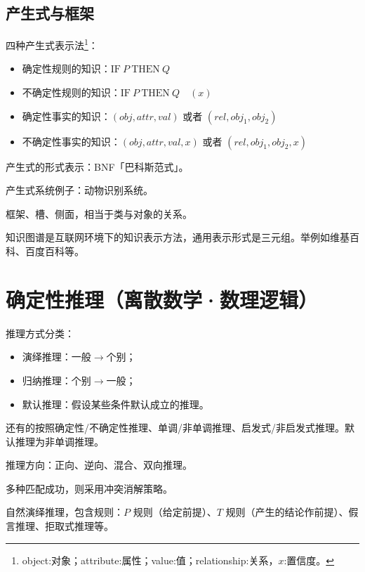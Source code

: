 \documentclass[UTF8]{ctexart}
\begin{document}
\subsection{产生式与框架}
四种产生式表示法\footnote{object:对象；attribute:属性；value:值；relationship:关系，$x$:置信度。}：
\begin{itemize}[itemsep=0pt,parsep=0pt]
  \item 确定性规则的知识：$\mathrm{IF}\ P\ \mathrm{THEN}\ Q$
  \item 不确定性规则的知识：$\mathrm{IF}\ P\ \mathrm{THEN}\ Q\quad (x)$
  \item 确定性事实的知识：$(obj, attr, val)$ 或者 $(rel, obj_1, obj_2)$
  \item 不确定性事实的知识：$(obj, attr, val, x)$ 或者 $(rel, obj_1, obj_2, x)$
\end{itemize}

产生式的形式表示：BNF「巴科斯范式」。

产生式系统例子：动物识别系统。

框架、槽、侧面，相当于类与对象的关系。

知识图谱是互联网环境下的知识表示方法，通用表示形式是三元组。举例如维基百科、百度百科等。

\section{确定性推理（离散数学·数理逻辑）}
推理方式分类：
\begin{itemize}[itemsep=0pt,parsep=0pt]
    \item 演绎推理：一般$\to$个别；
    \item 归纳推理：个别$\to$一般；
    \item 默认推理：假设某些条件默认成立的推理。
\end{itemize}
还有的按照确定性/不确定性推理、单调/非单调推理、启发式/非启发式推理。默认推理为非单调推理。

推理方向：正向、逆向、混合、双向推理。

多种匹配成功，则采用冲突消解策略。

自然演绎推理，包含规则：$P$ 规则（给定前提）、$T$ 规则（产生的结论作前提）、假言推理、拒取式推理等。
\end{document}
